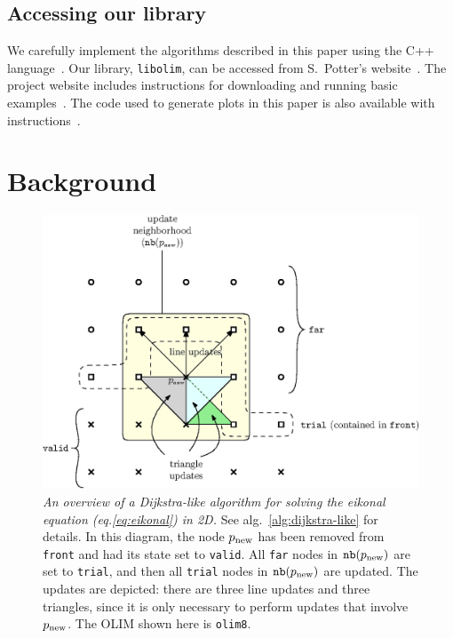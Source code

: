 \documentclass[smallcondensed]{svjour3}
\begin{document}
\subsection{Accessing our library} We carefully implement the
algorithms described in this paper using the C++
language~\cite{stroustrup2013c++}. Our library, \texttt{libolim}, can
be accessed from S.\ Potter's website~\cite{sfp-umiacs-homepage}. The
project website includes instructions for downloading and running
basic examples~\cite{libolim-github}. The code used to generate plots
in this paper is also available with
instructions~\cite{libolim-github-plotting}.

\section{Background}\label{sec:background}

\begin{figure}[t]
  \centering
  \includegraphics[width=0.9\linewidth]{overview-2.eps}
  \caption{\emph{An overview of a Dijkstra-like algorithm for solving
      the eikonal equation (eq.\@ \ref{eq:eikonal}) in 2D.} See alg.\
    \ref{alg:dijkstra-like} for details. In this diagram, the node
    $p_{\operatorname{new}}$ has been removed from \texttt{front} and had its state set
    to \texttt{valid}. All \texttt{far} nodes in $\texttt{nb}(p_{\operatorname{new}})$ are
    set to \texttt{trial}, and then all \texttt{trial} nodes in
    $\texttt{nb}(p_{\operatorname{new}})$ are updated. The updates are depicted: there are
    three line updates and three triangles, since it is only necessary
    to perform updates that involve $p_{\operatorname{new}}$. The OLIM shown here is
    \texttt{olim8}.}
  \label{fig:overview}
\end{figure}
\end{document}
